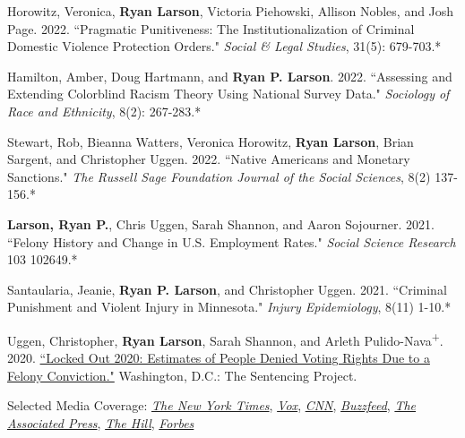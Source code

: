 \documentclass[letterpaper]{article}
\renewenvironment{itemize}{
  \begin{list}{}{
    \setlength{\leftmargin}{1.5em}
  }
}{
  \end{list}
}
\begin{document}
\begin{itemize}
\item Horowitz, Veronica,  \textbf{Ryan Larson}, Victoria Piehowski, Allison Nobles, and Josh Page. 2022. ``Pragmatic Punitiveness: The Institutionalization of Criminal Domestic Violence Protection Orders." \textit{Social \& Legal Studies}, 31(5): 679-703.*

\item Hamilton, Amber, Doug Hartmann, and \textbf{Ryan P. Larson}. 2022. ``Assessing and Extending Colorblind Racism Theory Using National Survey Data." \textit{Sociology of Race and Ethnicity}, 8(2): 267-283.*

\item Stewart, Rob, Bieanna Watters, Veronica Horowitz, \textbf{Ryan Larson}, Brian Sargent, and Christopher Uggen. 2022. ``Native Americans and Monetary Sanctions." \textit{The Russell Sage Foundation Journal of the Social Sciences}, 8(2) 137-156.*

\item  \textbf{Larson, Ryan P.}, Chris Uggen, Sarah Shannon, and Aaron Sojourner. 2021. ``Felony History and Change in U.S. Employment Rates." \textit{Social Science Research} 103 102649.*

\item  Santaularia, Jeanie, \textbf{Ryan P. Larson}, and Christopher Uggen. 2021. ``Criminal Punishment and Violent Injury in Minnesota." \textit{Injury Epidemiology}, 8(11) 1-10.*

\item Uggen, Christopher, \textbf{Ryan Larson}, Sarah Shannon, and Arleth Pulido-Nava\textsuperscript{+}. 2020. \href{https://www.sentencingproject.org/publications/locked-out-2020-estimates-of-people-denied-voting-rights-due-to-a-felony-conviction/}{``Locked Out 2020: Estimates of People Denied Voting Rights Due to a Felony Conviction."} Washington, D.C.: The Sentencing Project.
\begin{itemize}
\item Selected Media Coverage: \href{https://www.nytimes.com/live/2020/10/18/us/trump-vs-biden}{\textit{The New York Times}}, \href{https://www.vox.com/2020/10/14/21515850/voting-rights-sentencing-project-felon-disenfranchisement}{\textit{Vox}}, \href{https://www.cnn.com/2020/10/15/us/felony-convictions-voting-sentencing-project-study/index.html}{\textit{CNN}}, \href{https://www.buzzfeednews.com/article/skbaer/millions-cant-vote-2020-election-felony-convictions}{\textit{Buzzfeed}},  \href{https://apnews.com/article/election-2020-race-and-ethnicity-voting-rights-elections-tennessee-1467837105617bfd351b7b9969dc1683}{\textit{The Associated Press}}, \href{https://thehill.com/opinion/campaign/527510-thousands-of-people-with-felony-convictions-wont-be-able-to-vote-in-ga-run}{\textit{The Hill}}, \href{https://www.forbes.com/sites/joewalsh/2020/10/14/over-5-million-americans-wont-be-able-to-vote-next-month-because-of-criminal-records/?sh=3d0984982fc5}{\textit{Forbes}}
\end{itemize}


\end{itemize}
\end{document}
